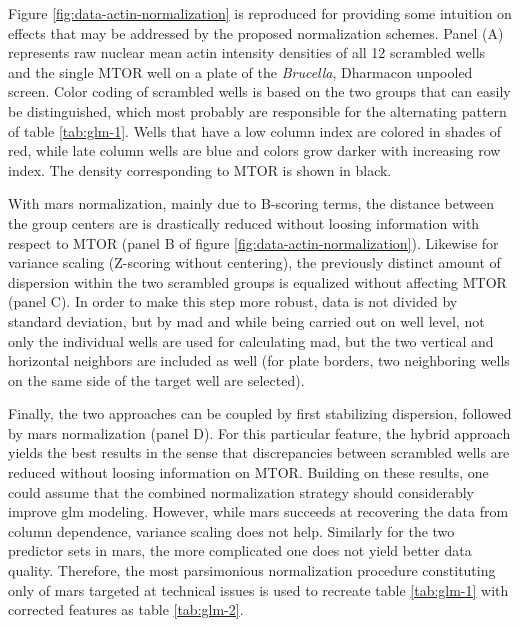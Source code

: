 

Figure \ref{fig:data-actin-normalization} is reproduced for providing some intuition on effects that may be addressed by the proposed normalization schemes. Panel (A) represents raw nuclear mean actin intensity densities of all 12 scrambled wells and the single MTOR well on a plate of the \textit{Brucella}, Dharmacon unpooled screen. Color coding of scrambled wells is based on the two groups that can easily be distinguished, which most probably are responsible for the alternating pattern of table \ref{tab:glm-1}. Wells that have a low column index are colored in shades of red, while late column wells are blue and colors grow darker with increasing row index. The density corresponding to MTOR is shown in black.

With \gls{mars} normalization, mainly due to B-scoring terms, the distance between the group centers are is drastically reduced without loosing information with respect to MTOR (panel B of figure \ref{fig:data-actin-normalization}). Likewise for variance scaling (Z-scoring without centering), the previously distinct amount of dispersion within the two scrambled groups is equalized without affecting MTOR (panel C). In order to make this step more robust, data is not divided by standard deviation, but by \gls{mad} and while being carried out on well level, not only the individual wells are used for calculating \gls{mad}, but the two vertical and horizontal neighbors are included as well (for plate borders, two neighboring wells on the same side of the target well are selected).

Finally, the two approaches can be coupled by first stabilizing dispersion, followed by \gls{mars} normalization (panel D). For this particular feature, the hybrid approach yields the best results in the sense that discrepancies between scrambled wells are reduced without loosing information on MTOR. Building on these results, one could assume that the combined normalization strategy should considerably improve \gls{glm} modeling. However, while \gls{mars} succeeds at recovering the data from column dependence, variance scaling does not help. Similarly for the two predictor sets in \gls{mars}, the more complicated one does not yield better data quality. Therefore, the most parsimonious normalization procedure constituting only of \gls{mars} targeted at technical issues is used to recreate table \ref{tab:glm-1} with corrected features as table \ref{tab:glm-2}.

